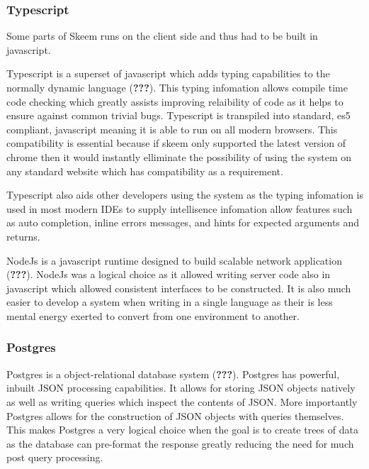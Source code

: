 \documentclass[
  12pt,
]{article}
\begin{document}
\hypertarget{typescript}{%
\subsubsection{Typescript}\label{typescript}}

Some parts of Skeem runs on the client side and thus had to be built in
javascript.

Typescript is a superset of javascript which adds typing capabilities to
the normally dynamic language ({\textbf{???}}). This typing infomation
allows compile time code checking which greatly assists improving
relaibility of code as it helps to ensure against common trivial bugs.
Typescript is transpiled into standard, es5 compliant, javascript
meaning it is able to run on all modern browsers. This compatibility is
essential because if skeem only supported the latest version of chrome
then it would instantly elliminate the possibility of using the system
on any standard website which has compatibility as a requirement.

Typescript also aids other developers using the system as the typing
infomation is used in most modern IDEs to supply intellisence infomation
allow features such as auto completion, inline errors messages, and
hints for expected arguments and returns.

NodeJs is a javascript runtime designed to build scalable network
application ({\textbf{???}}). NodeJs was a logical choice as it allowed
writing server code also in javascript which allowed consistent
interfaces to be constructed. It is also much easier to develop a system
when writing in a single language as their is less mental energy exerted
to convert from one environment to another.

\hypertarget{postgres}{%
\subsubsection{Postgres}\label{postgres}}

Postgres is a object-relational database system ({\textbf{???}}).
Postgres has powerful, inbuilt JSON processing capabilities. It allows
for storing JSON objects natively as well as writing queries which
inspect the contents of JSON. More importantly Postgres allows for the
construction of JSON objects with queries themselves. This makes
Postgres a very logical choice when the goal is to create trees of data
as the database can pre-format the response greatly reducing the need
for much post query processing.
\end{document}
